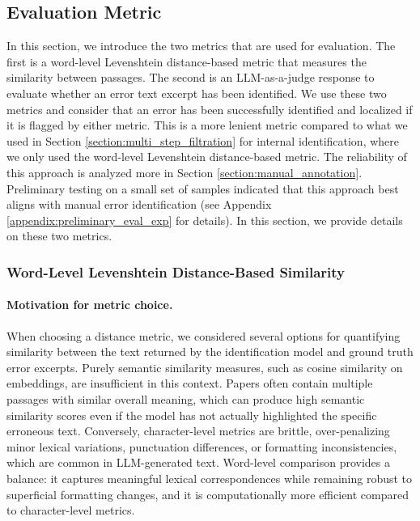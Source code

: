\documentclass{article}
\begin{document}
\subsection{Evaluation Metric}
In this section, we introduce the two metrics that are used for evaluation. The first is a word-level Levenshtein distance-based metric that measures the similarity between passages. The second is an LLM-as-a-judge response to evaluate whether an error text excerpt has been identified. We use these two metrics and consider that an error has been successfully identified and localized if it is flagged by either metric. This is a more lenient metric compared to what we used in Section \ref{section:multi_step_filtration} for internal identification, where we only used the word-level Levenshtein distance-based metric. The reliability of this approach is analyzed more in Section \ref{section:manual_annotation}. Preliminary testing on a small set of samples indicated that this approach best aligns with manual error identification (see Appendix \ref{appendix:preliminary_eval_exp} for details). In this section, we provide details on these two metrics.

\subsubsection{Word-Level Levenshtein Distance-Based Similarity}
\label{section:levenshtein_distance}
\paragraph{Motivation for metric choice.} When choosing a distance metric, we considered several options for quantifying similarity between the text returned by the identification model and ground truth error excerpts. Purely semantic similarity measures, such as cosine similarity on embeddings, are insufficient in this context. Papers often contain multiple passages with similar overall meaning, which can produce high semantic similarity scores even if the model has not actually highlighted the specific erroneous text. Conversely, character-level metrics are brittle, over-penalizing minor lexical variations, punctuation differences, or formatting inconsistencies, which are common in LLM-generated text. Word-level comparison provides a balance: it captures meaningful lexical correspondences while remaining robust to superficial formatting changes, and it is computationally more efficient compared to character-level metrics.
\end{document}

